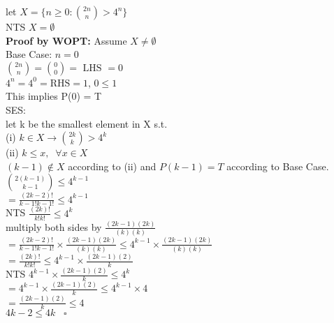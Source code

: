 \documentclass[12pt]{article}
\begin{document}
\begin{enumerate}
    let $X = \{ n \geq 0 : \binom{2n}{n} > 4^n\}$\\
    NTS $X=\emptyset$\\
    \textbf{Proof by WOPT: } Assume $X \neq \emptyset$\\
    Base Case: $n=0$\\
    $\binom{2n}{n} = \binom{0}{0}= \text{ LHS }=0$\\
    $4^n=4^0= \text{RHS}=1$, $0 \leq 1$\\
    This implies P(0) = T \\
    SES:\\
    let k be the smallest element in X s.t.\\
    (i) $k \in X \rightarrow \binom{2k}{k} > 4^k$\\
    (ii) $k \leq x, \;\; \forall x \in X$\\
    $(k-1) \notin X$ according to (ii) and $P(k-1) = T$ according to Base Case.\\
    $\binom{2(k-1)}{k-1} \leq 4^{k-1}$\\
    
    $= \frac{(2k-2)!}{k-1!k-1!} \leq 4^{k-1} $\\
    
    NTS $\frac{(2k)!}{k!k!} \leq 4^{k}$\\
    
    multiply both sides by $\frac{(2k-1)(2k)}{(k)(k)}$\\
    
    $= \frac{(2k-2)!}{k-1!k-1!}\times \frac{(2k-1)(2k)}{(k)(k)}  \leq 4^{k-1} \times \frac{(2k-1)(2k)}{(k)(k)} $\\
    
    $=\frac{(2k)!}{k!k!} \leq 4^{k-1} \times \frac{(2k-1)(2)}{k} $\\
    
    NTS $ 4^{k-1} \times \frac{(2k-1)(2)}{k} \leq 4^k$\\
    
    $= 4^{k-1} \times \frac{(2k-1)(2)}{k} \leq 4^{k-1} \times 4$\\
    
    $= \frac{(2k-1)(2)}{k} \leq 4$\\
    
     $4k-2 \leq 4k \;\;\;  \square$
    

\end{enumerate}
\end{document}
